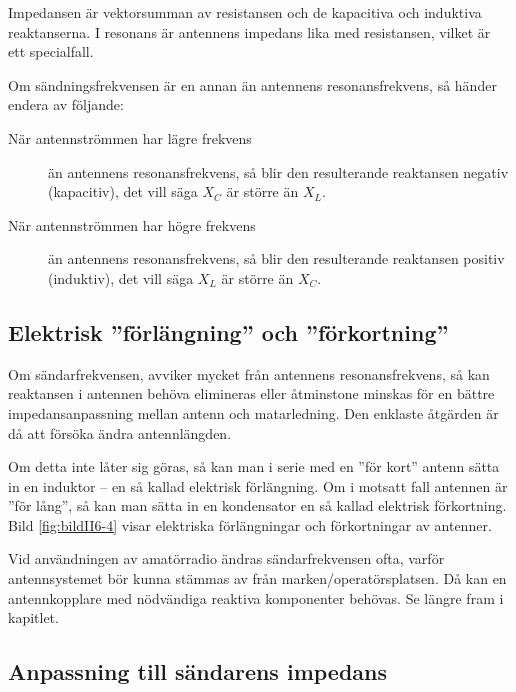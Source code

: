 Impedansen är vektorsumman av resistansen och de kapacitiva och
induktiva reaktanserna.
I resonans är antennens impedans lika med resistansen, vilket är ett
specialfall.

Om sändningsfrekvensen är en annan än antennens resonansfrekvens, så händer
endera av följande:

\begin{description}
\item[När antennströmmen har lägre frekvens] än antennens resonansfrekvens, så blir
den resulterande reaktansen negativ (kapacitiv), det vill säga \(X_C\) är större
än \(X_L\).

\item[När antennströmmen har högre frekvens] än antennens resonansfrekvens,
så blir den resulterande reaktansen positiv (induktiv), det vill säga \(X_L\)
är större än \(X_C\).
\end{description}


\subsection{Elektrisk ''förlängning'' och ''förkortning''}
\label{elektrisk förlängning}

Om sändarfrekvensen, avviker mycket från antennens resonansfrekvens,
så kan reaktansen i antennen behöva elimineras eller åtminstone
minskas för en bättre impedansanpassning mellan antenn och matarledning.
Den enklaste åtgärden är då att försöka ändra antennlängden.

Om detta inte låter sig göras, så kan man i serie med en ''för kort''
antenn sätta in en induktor -- en så kallad elektrisk förlängning.
Om i motsatt fall antennen är ''för lång'', så kan man sätta in en
kondensator en så kallad elektrisk förkortning.
Bild \ref{fig:bildII6-4} visar elektriska förlängningar och förkortningar av
antenner.

Vid användningen av amatörradio ändras sändarfrekvensen ofta, varför
antennsystemet bör kunna stämmas av från marken/operatörsplatsen.
Då kan en antennkopplare med nödvändiga reaktiva komponenter behövas.
Se längre fram i kapitlet.

\subsection{Anpassning till sändarens impedans}

